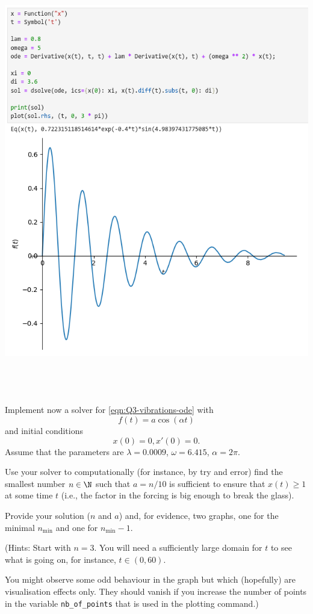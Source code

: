 \documentclass[a4paper]{article}
\begin{document}
\includegraphics[scale=0.6]{Q3-a}

\subsection{~} %

\begin{questionbody}
Implement now a solver for \eqref{eqn:Q3-vibrations-ode} with \[
f(t) = a \cos(\alpha t)
\] and initial conditions \[
x(0) = 0, x'(0) = 0.
\] Assume that the parameters are $\lambda = 0.0009$, $\omega = 6.415$, $\alpha = 2\pi$.

Use your solver to computationally (for instance, by try and error) find the smallest number $n \in \N$ such that $a = n/10$ is sufficient to ensure that $x(t) \ge 1$ at some time $t$ (i.e., the factor in the forcing is big enough to break the glass).

Provide your solution ($n$ and $a$) and, for evidence, two graphs, one for the minimal $n_\text{min}$ and one for $n_\text{min} - 1$.

(Hints: Start with $n = 3$. You will need a sufficiently large domain for $t$ to see what is going on, for instance, $t \in (0, 60)$.

You might observe some odd behaviour in the graph but which (hopefully) are visualisation effects only. They should vanish if you increase the number of points in the variable \texttt{nb\_of\_points} that is used in the plotting command.)
\end{questionbody}
\end{document}
